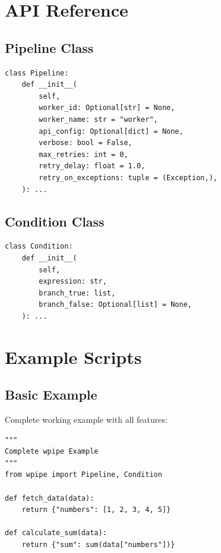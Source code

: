 \documentclass[12pt,a4paper]{report}
\begin{document}
\begin{appendices}
\chapter{API Reference}
\cleardoublepage

\section{Pipeline Class}

\begin{lstlisting}[caption={Pipeline Initialization}, label={lst:pipeline-init}]
class Pipeline:
    def __init__(
        self,
        worker_id: Optional[str] = None,
        worker_name: str = "worker",
        api_config: Optional[dict] = None,
        verbose: bool = False,
        max_retries: int = 0,
        retry_delay: float = 1.0,
        retry_on_exceptions: tuple = (Exception,),
    ): ...
\end{lstlisting}

\section{Condition Class}

\begin{lstlisting}[caption={Condition Initialization}, label={lst:condition-init}]
class Condition:
    def __init__(
        self,
        expression: str,
        branch_true: list,
        branch_false: Optional[list] = None,
    ): ...
\end{lstlisting}

\chapter{Example Scripts}
\cleardoublepage

\section{Basic Example}

Complete working example with all features:

\begin{lstlisting}[caption={Complete Example}, label={lst:complete}]
"""
Complete wpipe Example
"""
from wpipe import Pipeline, Condition

def fetch_data(data):
    return {"numbers": [1, 2, 3, 4, 5]}

def calculate_sum(data):
    return {"sum": sum(data["numbers"])}


\end{lstlisting}
\end{appendices}
\end{document}
